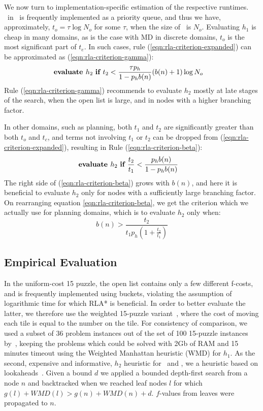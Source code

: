 We now turn to implementation-specific estimation of the respective runtimes.
\OPEN~in \astar~is frequently implemented as a priority queue, and thus we have, approximately,
$t_o=\tau \log N_o$ for some $\tau$, when the size of \OPEN~is $N_o$.
Evaluating $h_1$ is cheap in many domains, as is the
case with MD in discrete domains, $t_o$ is the most significant part of
$t_{e}$. In such cases,
rule (\ref{eqn:rla-criterion-expanded}) can be approximated as (\ref{eqn:rla-criterion-gamma}):
\begin{align}
  &\mbox{\bf evaluate }h_2\mbox{ \bf if } t_2 < \frac {\tau p_h} {1-p_hb(n)} (b(n)+1)\log N_o
\label{eqn:rla-criterion-gamma}
\end{align}
Rule (\ref{eqn:rla-criterion-gamma})
recommends to evaluate $h_2$ mostly at late stages of the search,
when the open list is large, and in nodes with a higher branching factor.

In other domains, such as planning, both $t_1$ and $t_2$ are
significantly greater than both $t_o$ and $t_c$, and terms
not involving $t_1$ or $t_2$ can be dropped from
(\ref{eqn:rla-criterion-expanded}), resulting in Rule (\ref{eqn:rla-criterion-beta}):
\begin{align}
  &\mbox{\bf evaluate }h_2\mbox{ \bf if } \frac{t_2}{t_1} < \frac {p_hb(n)} {1-p_hb(n)}
\label{eqn:rla-criterion-beta}
\end{align}
The right side of (\ref{eqn:rla-criterion-beta}) grows with $b(n)$, and here it is beneficial to evaluate $h_2$
only for nodes with a sufficiently large branching factor. On rearranging equation \ref{eqn:rla-criterion-beta},
we get the criterion which we actually use for planning domains,
which is to evaluate $h_2$ only when:
\begin{equation}
b(n) > \frac{t_2}{t_1 p_h \left(1 + \frac{t_2}{t_1}\right)}
\label{eqn:rla-planning-rule}
\end{equation}

\subsection{Empirical Evaluation}

In the uniform-cost 15 puzzle, the open list contains only a few different
f-costs, and is frequently implemented using buckets, violating the
assumption of logarithmic time for which RLA* is beneficial. In order
to better evaluate the latter, we therefore use the weighted 15-puzzle
variant~\cite{thayer:bss}, where the cost of moving each tile is equal
to the number on the tile.  For consistency of comparison, we used a
subset of 36 problem instances out of the set of 100 15-puzzle instances
by~\cite{BFID85}, keeping the problems which could be solved with 2Gb
of RAM and 15 minutes timeout using the Weighted Manhattan heuristic
(WMD) for $h_1$. As the second, expensive and informative, $h_2$
heuristic for \lazyastar~and \rationallazyastar, we a heuristic based on
lookaheads~\cite{DBLP:conf/aaai/SternKFH10}. Given a bound $d$ we applied
a bounded depth-first search from a node $n$ and backtracked when we
reached leaf nodes $l$ for which $g(l)+WMD(l)> g(n)+WMD(n)+d$. $f$-values
from leaves were propagated to $n$.


